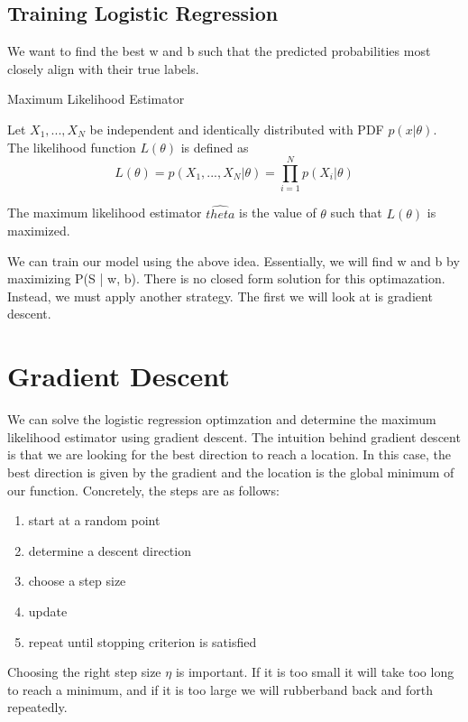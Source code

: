 \subsection*{Training Logistic Regression}
We want to find the best w and b such that the predicted probabilities most closely align with their true labels.

\begin{definition}
    Maximum Likelihood Estimator

    Let $X_1, ..., X_N$ be independent and identically distributed with PDF $p(x|\theta)$. The likelihood function $L(\theta)$ is defined as 
    \[
        L(\theta) = p(X_1, ..., X_N | \theta) = \prod_{i=1}^{N}p(X_i | \theta)
    \]

    The maximum likelihood estimator $\hat{theta}$ is the value of $\theta$ such that $L(\theta)$ is maximized.
\end{definition}

We can train our model using the above idea. Essentially, we will find w and b by maximizing P(S | w, b). There is no closed form solution for this optimazation. Instead, we must apply another strategy. The first we will look at is gradient descent.

\section{Gradient Descent}
\begin{center}
\end{center}
We can solve the logistic regression optimzation and determine the maximum likelihood estimator using gradient descent. The intuition behind gradient descent is that we are looking for the best direction to reach a location. In this case, the best direction is given by the gradient and the location is the global minimum of our function. Concretely, the steps are as follows:
\begin{enumerate}
    \item start at a random point
    \item determine a descent direction
    \item choose a step size
    \item update
    \item repeat until stopping criterion is satisfied
\end{enumerate}


Choosing the right step size $\eta$ is important. If it is too small it will take too long to reach a minimum, and if it is too large we will rubberband back and forth repeatedly.
\begin{center}
\end{center}